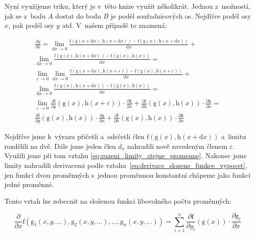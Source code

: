 Nyní využijeme triku, který je v~této knize využit několikrát. Jednou z~možností, jak se z~bodu \(A\) dostat do bodu \(B\) je podél souřadnicových os. Nejdříve podél osy \(x\), pak podél osy \(y\) atd. V~našem případě to znamená:


\begin{equation}
\begin{split}
\frac{\partial y}{\partial x} = \lim_{\mathrm{d}x \to 0} \frac{\mathrm{f}(\mathrm{g}(x + \mathrm{d}x), \mathrm{h}(x + \mathrm{d}x)) - \mathrm{f}(\mathrm{g}(x), \mathrm{h}(x + \mathrm{d}x))}{\mathrm{d}x} + \\
\lim_{\mathrm{d}x \to 0} \frac{\mathrm{f}(\mathrm{g}(x), \mathrm{h}(x + \mathrm{d}x)) - \mathrm{f}(\mathrm{g}(x), \mathrm{h}(x))}{\mathrm{d}x} = \\
\lim_{\varepsilon \to 0} \lim_{\mathrm{d}x \to 0} \frac{\mathrm{f}(\mathrm{g}(x + \mathrm{d}x), \mathrm{h}(x + \varepsilon)) - \mathrm{f}(\mathrm{g}(x), \mathrm{h}(x + \varepsilon))}{\mathrm{d}x} + \\
\lim_{\mathrm{d}x \to 0} \frac{\mathrm{f}(\mathrm{g}(x), \mathrm{h}(x + \mathrm{d}x)) - \mathrm{f}(\mathrm{g}(x), \mathrm{h}(x))}{\mathrm{d}x} = \\
\lim_{\varepsilon \to 0} \frac{\partial \mathrm{f}}{\partial g}(\mathrm{g}(x), \mathrm{h}(x + \varepsilon)) \cdot \frac{\partial \mathrm{g}}{\partial x} +
\frac{\partial \mathrm{f}}{\partial h}(\mathrm{g}(x), \mathrm{h}(x)) \cdot \frac{\partial \mathrm{h}}{\partial x} = \\
\frac{\partial \mathrm{f}}{\partial g}(\mathrm{g}(x), \mathrm{h}(x)) \cdot \frac{\partial \mathrm{g}}{\partial x} +
\frac{\partial \mathrm{f}}{\partial h}(\mathrm{g}(x), \mathrm{h}(x)) \cdot \frac{\partial \mathrm{h}}{\partial x}
\end{split}
\end{equation}

Nejdříve jsme k~výrazu přičetli a~odečetli člen \(\mathrm{f}(\mathrm{g}(x), \mathrm{h}(x + \mathrm{d}x))\) a~limitu rozdělili na dvě. Dále jsme jeden člen \(d_x\) nahradili nově zavedeným členem \(\varepsilon\). Využili jsme při tom vztahu \eqref{eq:zuzeni_limity_stejne_promenne}.
Nakonec jsme limity nahradili derivacemi podle vztahu~\eqref{eq:derivace_slozene_funkce_vypocet}, jen funkci dvou proměnných s~jednou proměnnou konstantní chápeme jako funkci jedné proměnné.

Tento vztah lze zobecnit na složenou funkci libovolného počtu proměnných:

\begin{equation}
\frac{\partial}{\partial x} \mathrm{f} (\mathrm{g}_1(x, y, ...), \mathrm{g}_2(x, y, ...), ..., \mathrm{g}_n(x, y, ...)) = \sum_{i=1}^n \frac{\partial \mathrm{f}}{\partial g_i}(\mathrm{g}(x)) \cdot \frac{\partial \mathrm{g}_i}{\partial x}
\end{equation}

